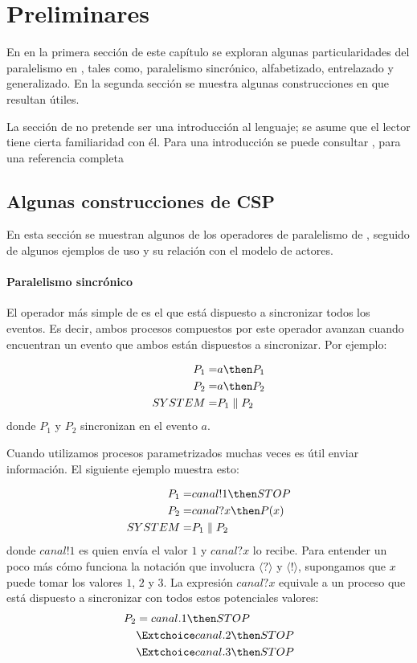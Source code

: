 \chapter{Preliminares}

En en la primera sección de este capítulo se exploran algunas particularidades del paralelismo en \CSP, tales como, paralelismo sincrónico, alfabetizado, entrelazado y generalizado. En la segunda sección se muestra algunas construcciones en \CSPm que resultan útiles. 

La sección de \CSP no pretende ser una introducción al lenguaje; se asume que el lector tiene cierta familiaridad con él. Para una introducción se puede consultar \cite{Cristia:CSP}, para una referencia completa \cite{Roscoe:1997:TPC:550448}

\section{Algunas construcciones de CSP}

En esta sección se muestran algunos de los operadores de paralelismo de \CSP, seguido de algunos ejemplos de uso y su relación con el modelo de actores.  

\subsubsection*{Paralelismo sincrónico}

El operador más simple de \CSP es el que está dispuesto a sincronizar todos los eventos. Es decir, ambos procesos compuestos por este operador avanzan cuando encuentran un evento que ambos están dispuestos a sincronizar. Por ejemplo:

\begin{align*}
P_1 =& a \then P_1\\
P_2 =& a \then P_2 \\
SYSTEM =& P_1 \parallel P_2
\end{align*}
donde $P_1$ y $P_2$ sincronizan en el evento $a$. 

Cuando utilizamos procesos parametrizados muchas veces es útil enviar información. El siguiente ejemplo muestra esto:

\begin{align*}
P_1 =& canal!1 \then STOP \\
P_2 =& canal?x \then P(x) \\
SYSTEM =& P_1 \parallel P_2 \\
\end{align*}
donde $canal!1$ es quien envía el valor $1$ y $canal?x$ lo recibe. Para entender un poco más cómo funciona la notación que involucra $\langle ? \rangle$ y $\langle ! \rangle$, supongamos que $x$ puede tomar los valores $1$, $2$ y $3$. La expresión $canal?x$ equivale a un proceso que está dispuesto a sincronizar con todos estos potenciales valores:
\begin{align*}
P_2 & =  canal.1 \then STOP \\
      & \Extchoice canal.2 \then STOP \\
      & \Extchoice canal.3 \then STOP 
\end{align*}

